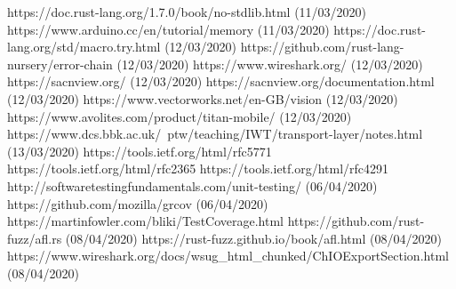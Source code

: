 \documentclass[11pt,a4paper]{article}
\begin{document}
\begin{thebibliography}{9}
	https://doc.rust-lang.org/1.7.0/book/no-stdlib.html (11/03/2020)
	https://www.arduino.cc/en/tutorial/memory (11/03/2020)
	https://doc.rust-lang.org/std/macro.try.html (12/03/2020)
	https://github.com/rust-lang-nursery/error-chain (12/03/2020)
	https://www.wireshark.org/ (12/03/2020)		
	https://sacnview.org/ (12/03/2020)
	https://sacnview.org/documentation.html (12/03/2020)
	https://www.vectorworks.net/en-GB/vision (12/03/2020)
	https://www.avolites.com/product/titan-mobile/ (12/03/2020)
	https://www.dcs.bbk.ac.uk/~ptw/teaching/IWT/transport-layer/notes.html (13/03/2020)
	https://tools.ietf.org/html/rfc5771
	https://tools.ietf.org/html/rfc2365
	https://tools.ietf.org/html/rfc4291
	http://softwaretestingfundamentals.com/unit-testing/ (06/04/2020)
	https://github.com/mozilla/grcov (06/04/2020)
	https://martinfowler.com/bliki/TestCoverage.html
	https://github.com/rust-fuzz/afl.rs (08/04/2020)
	https://rust-fuzz.github.io/book/afl.html (08/04/2020)
	https://www.wireshark.org/docs/wsug\_html\_chunked/ChIOExportSection.html (08/04/2020)
\end{thebibliography}
\end{document}
